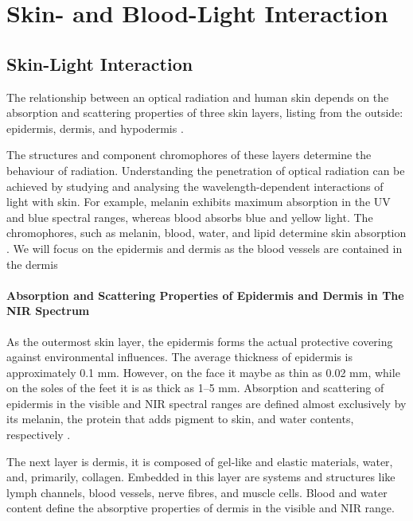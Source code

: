 
\chapter{Skin- and Blood-Light Interaction}\label{chapter:Skin- and Blood-Light Interaction}


\section{Skin-Light Interaction}

The relationship between an optical radiation and human skin depends
on the absorption and scattering properties of three skin layers, listing from the outside: epidermis, dermis, and hypodermis \parencite{skin}.
 
The structures and component chromophores of these layers determine the behaviour of radiation. Understanding the penetration of optical radiation can be achieved by studying and analysing the wavelength-dependent interactions of light with skin. For example, melanin exhibits maximum absorption in the UV and blue spectral
ranges, whereas blood absorbs blue and yellow light. The chromophores, such as melanin, blood, water, and lipid determine skin absorption \parencite{skin1}.
We will focus on the epidermis and dermis as the blood vessels are contained in the dermis

\subsubsection{Absorption and Scattering Properties of Epidermis and Dermis in The NIR Spectrum}

As the outermost skin layer, the epidermis forms the actual protective covering against environmental influences. The average thickness of epidermis is approximately 0.1 mm. However, on the face it maybe as thin as 0.02 mm, while on the soles of the feet it is as thick as 1–5 mm. Absorption and scattering of epidermis in the visible and NIR spectral ranges are defined almost exclusively by its melanin, the protein that adds pigment to skin, and water contents, respectively \parencite{skin1}.

The next layer is dermis, it is composed of gel-like and elastic materials, water, and, primarily, collagen. Embedded in this layer are systems and structures like lymph channels, blood vessels, nerve fibres, and muscle cells. Blood and water content define the absorptive properties of dermis in the visible and NIR range\parencite{skin1}.

